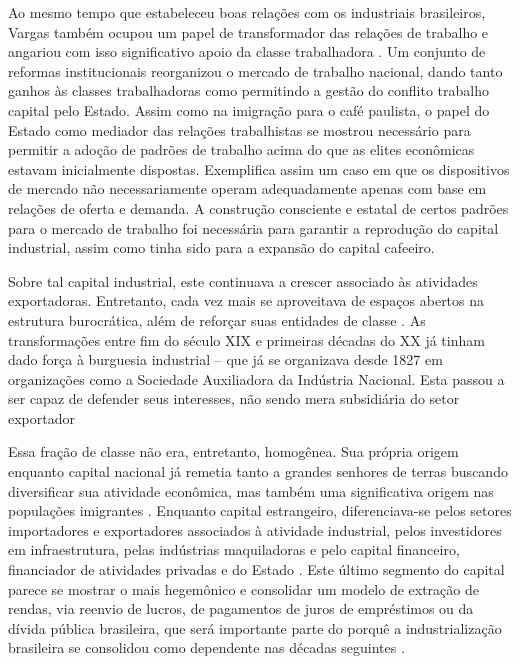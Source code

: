 Ao mesmo tempo que estabeleceu boas relações com os industriais
brasileiros, Vargas também ocupou um papel de transformador das relações
de trabalho e angariou com isso significativo apoio da classe
trabalhadora \citep[]{schwarcz_brasil_2015}. Um conjunto de reformas institucionais
reorganizou o mercado de trabalho nacional, dando tanto ganhos às
classes trabalhadoras como permitindo a gestão do conflito trabalho
capital pelo Estado. Assim como na imigração para o café paulista, o
papel do Estado como mediador das relações trabalhistas se mostrou
necessário para permitir a adoção de padrões de trabalho acima do que as
elites econômicas estavam inicialmente dispostas. Exemplifica assim um
caso em que os dispositivos de mercado não necessariamente operam
adequadamente apenas com base em relações de oferta e demanda. A
construção consciente e estatal de certos padrões para o mercado de
trabalho foi necessária para garantir a reprodução do capital
industrial, assim como tinha sido para a expansão do capital cafeeiro.

\begin{esboco}
\end{esboco}

Sobre tal capital industrial, este continuava a crescer associado às
atividades exportadoras. Entretanto, cada vez mais se aproveitava de
espaços abertos na estrutura burocrática, além de reforçar suas
entidades de classe .
As transformações entre fim do século XIX e
primeiras décadas do XX já tinham dado força à burguesia industrial --
que já se organizava desde 1827 em organizações como a Sociedade
Auxiliadora da Indústria Nacional. Esta passou a ser capaz de defender
seus interesses, não sendo mera subsidiária do setor exportador
\citep[]{perissinotto_ideias_2023}

Essa fração de classe não era, entretanto, homogênea. Sua própria origem
enquanto capital nacional já remetia tanto a grandes senhores de terras
buscando diversificar sua atividade econômica, mas também uma
significativa origem nas populações imigrantes \citep[]{jr_historia_2021}.
Enquanto capital estrangeiro, diferenciava-se pelos setores importadores e exportadores
associados à atividade industrial, pelos investidores em infraestrutura,
pelas indústrias maquiladoras e pelo capital financeiro, financiador de
atividades privadas e do Estado \citep[]{jr_historia_2021}.
Este último segmento do capital parece
se mostrar o mais hegemônico \citep[]{jr_historia_2021} e consolidar um modelo de
extração de rendas, via reenvio de lucros, de pagamentos de juros
de empréstimos ou da dívida pública brasileira, que será importante
parte do porquê a industrialização brasileira se consolidou como
dependente nas décadas seguintes \citep[]{evans_dependent_1979}.

